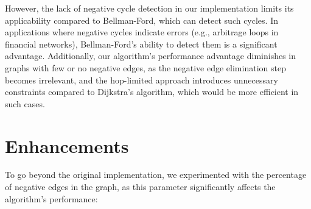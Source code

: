 \documentclass[12pt]{article}
\begin{document}
However, the lack of negative cycle detection in our implementation limits its applicability compared to Bellman-Ford, which can detect such cycles. In applications where negative cycles indicate errors (e.g., arbitrage loops in financial networks), Bellman-Ford’s ability to detect them is a significant advantage. Additionally, our algorithm’s performance advantage diminishes in graphs with few or no negative edges, as the negative edge elimination step becomes irrelevant, and the hop-limited approach introduces unnecessary constraints compared to Dijkstra’s algorithm, which would be more efficient in such cases.

\section{Enhancements}
To go beyond the original implementation, we experimented with the percentage of negative edges in the graph, as this parameter significantly affects the algorithm’s performance:
\end{document}
